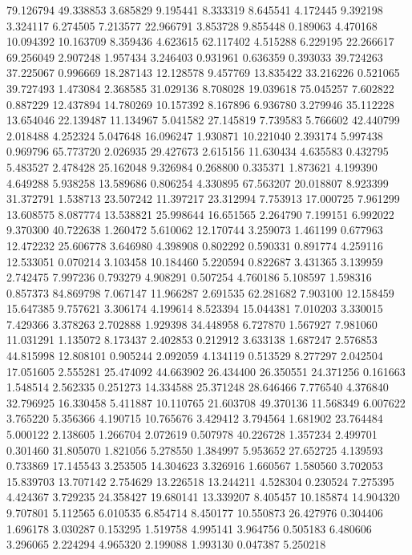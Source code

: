 79.126794
49.338853
3.685829
9.195441
8.333319
8.645541
4.172445
9.392198
3.324117
6.274505
7.213577
22.966791
3.853728
9.855448
0.189063
4.470168
10.094392
10.163709
8.359436
4.623615
62.117402
4.515288
6.229195
22.266617
69.256049
2.907248
1.957434
3.246403
0.931961
0.636359
0.393033
39.724263
37.225067
0.996669
18.287143
12.128578
9.457769
13.835422
33.216226
0.521065
39.727493
1.473084
2.368585
31.029136
8.708028
19.039618
75.045257
7.602822
0.887229
12.437894
14.780269
10.157392
8.167896
6.936780
3.279946
35.112228
13.654046
22.139487
11.134967
5.041582
27.145819
7.739583
5.766602
42.440799
2.018488
4.252324
5.047648
16.096247
1.930871
10.221040
2.393174
5.997438
0.969796
65.773720
2.026935
29.427673
2.615156
11.630434
4.635583
0.432795
5.483527
2.478428
25.162048
9.326984
0.268800
0.335371
1.873621
4.199390
4.649288
5.938258
13.589686
0.806254
4.330895
67.563207
20.018807
8.923399
31.372791
1.538713
23.507242
11.397217
23.312994
7.753913
17.000725
7.961299
13.608575
8.087774
13.538821
25.998644
16.651565
2.264790
7.199151
6.992022
9.370300
40.722638
1.260472
5.610062
12.170744
3.259073
1.461199
0.677963
12.472232
25.606778
3.646980
4.398908
0.802292
0.590331
0.891774
4.259116
12.533051
0.070214
3.103458
10.184460
5.220594
0.822687
3.431365
3.139959
2.742475
7.997236
0.793279
4.908291
0.507254
4.760186
5.108597
1.598316
0.857373
84.869798
7.067147
11.966287
2.691535
62.281682
7.903100
12.158459
15.647385
9.757621
3.306174
4.199614
8.523394
15.044381
7.010203
3.330015
7.429366
3.378263
2.702888
1.929398
34.448958
6.727870
1.567927
7.981060
11.031291
1.135072
8.173437
2.402853
0.212912
3.633138
1.687247
2.576853
44.815998
12.808101
0.905244
2.092059
4.134119
0.513529
8.277297
2.042504
17.051605
2.555281
25.474092
44.663902
26.434400
26.350551
24.371256
0.161663
1.548514
2.562335
0.251273
14.334588
25.371248
28.646466
7.776540
4.376840
32.796925
16.330458
5.411887
10.110765
21.603708
49.370136
11.568349
6.007622
3.765220
5.356366
4.190715
10.765676
3.429412
3.794564
1.681902
23.764484
5.000122
2.138605
1.266704
2.072619
0.507978
40.226728
1.357234
2.499701
0.301460
31.805070
1.821056
5.278550
1.384997
5.953652
27.652725
4.139593
0.733869
17.145543
3.253505
14.304623
3.326916
1.660567
1.580560
3.702053
15.839703
13.707142
2.754629
13.226518
13.244211
4.528304
0.230524
7.275395
4.424367
3.729235
24.358427
19.680141
13.339207
8.405457
10.185874
14.904320
9.707801
5.112565
6.010535
6.854714
8.450177
10.550873
26.427976
0.304406
1.696178
3.030287
0.153295
1.519758
4.995141
3.964756
0.505183
6.480606
3.296065
2.224294
4.965320
2.199088
1.993130
0.047387
5.250218
